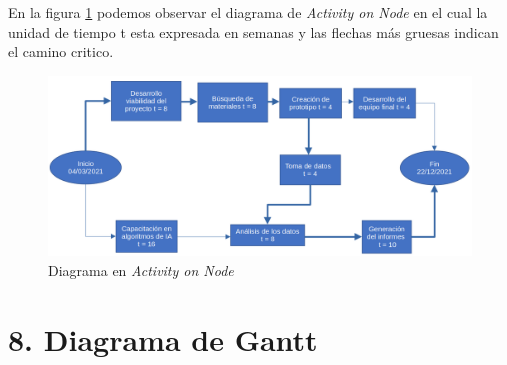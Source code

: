 \documentclass[11pt]{charter}
\begin{document}



En la figura \ref{fig:AoN} podemos observar el diagrama de \textit{Activity on Node} en el cual la unidad de tiempo t esta expresada en semanas y las flechas más gruesas indican el camino critico.
\newline

\begin{figure}[htpb]
\centering 
\includegraphics[width=\textwidth]{./Figuras/diagAoN.png} %
\caption{Diagrama en \textit{Activity on Node}}
\label{fig:AoN}
\end{figure}


\section{8. Diagrama de Gantt}
\label{sec:gantt}
\end{document}
